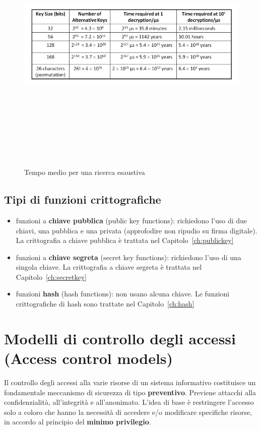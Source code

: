 \begin{figure}[htbp]
	\centering%
	\subfigure%
	{\includegraphics[height=12cm, width=13cm, keepaspectratio]{Immagini/introduzione/tab_tempi.png}}
	\caption{Tempo medio per una ricerca esaustiva \label{fig:tab_tempi}} 	
\end{figure}

\subsection{Tipi di funzioni crittografiche}
\begin{itemize} 
  \item funzioni a \textbf{chiave pubblica} (public key functions): richiedono l'uso di due chiavi, una pubblica e una privata (approfodire non ripudio su firma digitale). La crittografia a chiave pubblica è trattata nel Capitolo~\ref{ch:publickey}
  \item funzioni a \textbf{chiave segreta} (secret key functions): richiedono l'uso di una singola chiave. La crittografia a chiave segreta è trattata nel Capitolo~\ref{ch:secretkey}
  \item funzioni \textbf{hash} (hash functions): non usano alcuna chiave. Le funzioni crittografiche di hash sono trattate nel Capitolo~\ref{ch:hash}
\end{itemize}

\section{Modelli di controllo degli accessi (Access control models)}
Il controllo degli accessi alla varie risorse di un sistema informativo costituisce un fondamentale meccanismo di sicurezza di tipo \textbf{preventivo}. Previene attacchi alla confidenzialità, all'integrità e all'anonimato. L'idea di base è restringere l’accesso solo a coloro che hanno la necessità di accedere e/o modificare specifiche risorse, in accordo al principio del \textbf{minimo privilegio}.

